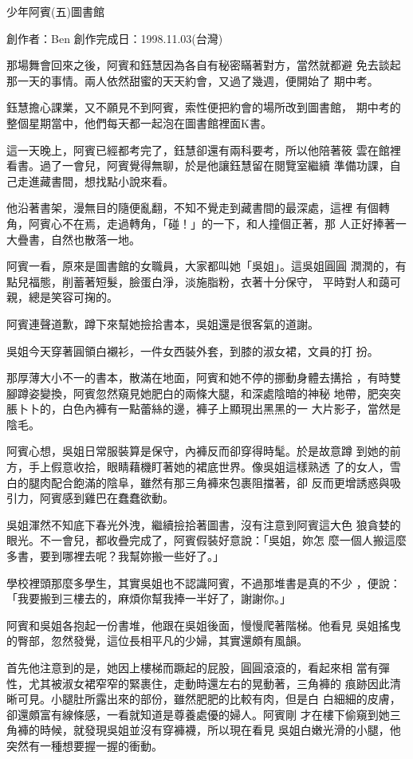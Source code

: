 



少年阿賓(五)圖書館

創作者：Ben
創作完成日：1998.11.03(台灣)


那場舞會回來之後，阿賓和鈺慧因為各自有秘密瞞著對方，當然就都避
免去談起那一天的事情。兩人依然甜蜜的天天約會，又過了幾週，便開始了
期中考。

鈺慧擔心課業，又不願見不到阿賓，索性便把約會的場所改到圖書館，
期中考的整個星期當中，他們每天都一起泡在圖書館裡面K書。

這一天晚上，阿賓已經都考完了，鈺慧卻還有兩科要考，所以他陪著筱
雲在館裡看書。過了一會兒，阿賓覺得無聊，於是他讓鈺慧留在閱覽室繼續
準備功課，自己走進藏書間，想找點小說來看。

他沿著書架，漫無目的隨便亂翻，不知不覺走到藏書間的最深處，這裡
有個轉角，阿賓心不在焉，走過轉角，「碰！」的一下，和人撞個正著，那
人正好捧著一大疊書，自然也散落一地。

阿賓一看，原來是圖書館的女職員，大家都叫她「吳姐」。這吳姐圓圓
潤潤的，有點兒福態，削蓄著短髮，臉蛋白淨，淡施脂粉，衣著十分保守，
平時對人和藹可親，總是笑容可掬的。

阿賓連聲道歉，蹲下來幫她撿拾書本，吳姐還是很客氣的道謝。

吳姐今天穿著圓領白襯衫，一件女西裝外套，到膝的淑女裙，文員的打
扮。

那厚薄大小不一的書本，散滿在地面，阿賓和她不停的挪動身體去搆拾
，有時雙腳蹲姿變換，阿賓忽然窺見她肥白的兩條大腿，和深處陰暗的神秘
地帶，肥突突脹卜卜的，白色內褲有一點蕾絲的邊，褲子上顯現出黑黑的一
大片影子，當然是陰毛。

阿賓心想，吳姐日常服裝算是保守，內褲反而卻穿得時髦。於是故意蹲
到她的前方，手上假意收拾，眼睛藉機盯著她的裙底世界。像吳姐這樣熟透
了的女人，雪白的腿肉配合飽滿的陰阜，雖然有那三角褲來包裹阻擋著，卻
反而更增誘惑與吸引力，阿賓感到雞巴在蠢蠢欲動。

吳姐渾然不知底下春光外洩，繼續撿拾著圖書，沒有注意到阿賓這大色
狼貪婪的眼光。不一會兒，都收疊完成了，阿賓假裝好意說：「吳姐，妳怎
麼一個人搬這麼多書，要到哪裡去呢？我幫妳搬一些好了。」

學校裡頭那麼多學生，其實吳姐也不認識阿賓，不過那堆書是真的不少
，便說：「我要搬到三樓去的，麻煩你幫我捧一半好了，謝謝你。」

阿賓和吳姐各抱起一份書堆，他跟在吳姐後面，慢慢爬著階梯。他看見
吳姐搖曳的臀部，忽然發覺，這位長相平凡的少婦，其實還頗有風韻。

首先他注意到的是，她因上樓梯而蹶起的屁股，圓圓滾滾的，看起來相
當有彈性，尤其被淑女裙窄窄的緊裹住，走動時還左右的晃動著，三角褲的
痕跡因此清晰可見。小腿肚所露出來的部份，雖然肥肥的比較有肉，但是白
白細細的皮膚，卻還頗富有線條感，一看就知道是尊養處優的婦人。阿賓剛
才在樓下偷窺到她三角褲的時候，就發現吳姐並沒有穿褲襪，所以現在看見
吳姐白嫩光滑的小腿，他突然有一種想要握一握的衝動。


